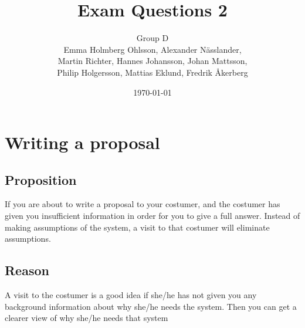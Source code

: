 \documentclass[a4paper]{article}
\title{Exam Questions 2}
\author{Group D\\ Emma Holmberg Ohlsson, Alexander Nässlander,\\Martin Richter, Hannes Johansson, Johan Mattsson,\\Philip Holgersson, Mattias Eklund, Fredrik Åkerberg}
\date{\today}
\begin{document}
	\maketitle
	\thispagestyle{empty}
	\setcounter{page}{0}
	\pagebreak



\section{Writing a proposal}
\subsection*{Proposition}
If you are about to write a proposal to your costumer, and the costumer has given you insufficient information in order for you to give a full answer. Instead of making assumptions of the system, a visit to that costumer will eliminate assumptions.   
\subsection*{Reason}
A visit to the costumer is a good idea if she/he has not given you any background information about why she/he needs the system.
Then you can get a clearer view of why she/he needs that system
\end{document}
